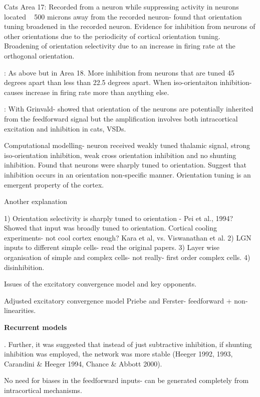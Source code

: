 \cite{Worgotter1988, Eysel1990} Cats Area 17: Recorded from a neuron while suppressing activity in neurons located ~ 500 microns away from the recorded neuron- found that orientation tuning broadened in the recorded neuron. Evidence for inhibition from neurons of other orientations due to the periodicity of cortical orientation tuning. Broadening of orientation selectivity due to an increase in firing rate at the orthogonal orientation. 

\cite{Crook1992}: As above but in Area 18. More inhibition from neurons that are tuned 45 degrees apart than less than 22.5 degrees apart. When iso-orientaiton inhibition- causes increase in firing rate more than anything else.

\cite{Sharon2002}: With Grinvald- showed that orientation of the neurons are potentially inherited from the feedforward signal but the amplification involves both intracortical excitation and inhibition in cats, VSDs.

\cite{Somers1995} Computational modelling- neuron received weakly tuned thalamic signal, strong iso-orientation inhibition, weak cross orientation inhibition and no shunting inhibition. Found that neurons were sharply tuned to orientation. Suggest that inhibition occurs in an orientation non-specific manner. Orientation tuning is an emergent property of the cortex.

Another explanation

1) Orientation selectivity is sharply tuned to orientation - Pei et al., 1994? Showed that input was broadly tuned to orientation. Cortical cooling experiments- not cool cortex enough? Kara et al, vs. Viswanathan et al.
2) LGN inputs to different simple cells- read the original papers.
3) Layer wise organisation of simple and complex cells- not really- first order complex cells.
4) disinhibition.

Issues of the excitatory convergence model and key opponents.

Adjusted excitatory convergence model
Priebe and Ferster- feedforward + non-linearities.


\textbf{Recurrent models}

\cite{Somers1995, Douglas1995}. Further, it was suggested that instead of just subtractive inhibition, if shunting inhibition was employed, the network was more stable (Heeger 1992, 1993, Carandini \& Heeger 1994, Chance \& Abbott 2000).

\cite{Adorjan1999} No need for biases in the feedforward inputs- can be generated completely from intracortical mechanisms.

